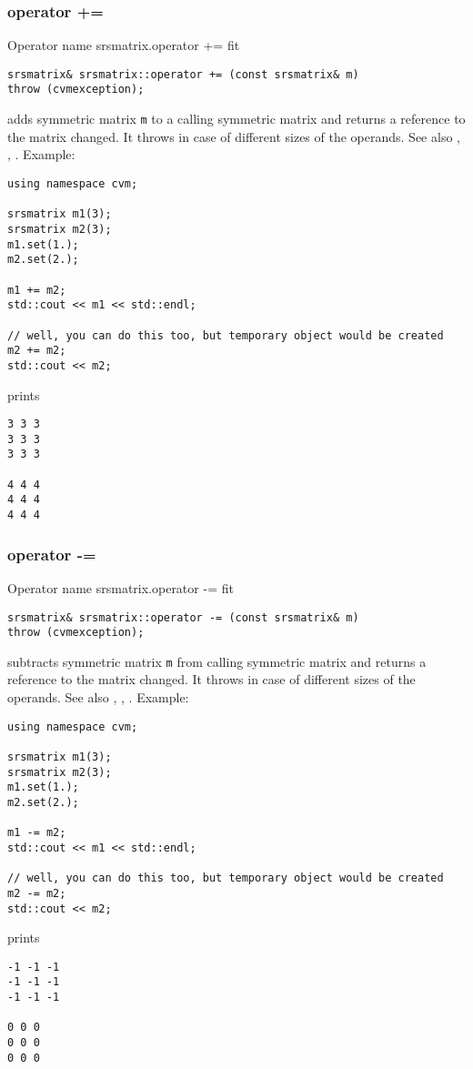 \subsubsection{operator +=}
Operator%
\pdfdest name {srsmatrix.operator +=} fit
\begin{verbatim}
srsmatrix& srsmatrix::operator += (const srsmatrix& m)
throw (cvmexception);
\end{verbatim}
adds symmetric matrix \verb"m" to a calling symmetric matrix 
and returns a reference to
the matrix changed.
It throws  
in case of different sizes of the operands.
See also ,
,
.
Example:
\begin{Verbatim}
using namespace cvm;

srsmatrix m1(3);
srsmatrix m2(3);
m1.set(1.);
m2.set(2.);

m1 += m2;
std::cout << m1 << std::endl;

// well, you can do this too, but temporary object would be created
m2 += m2; 
std::cout << m2;
\end{Verbatim}
prints
\begin{Verbatim}
3 3 3
3 3 3
3 3 3

4 4 4
4 4 4
4 4 4
\end{Verbatim}
\newpage




\subsubsection{operator -=}
Operator%
\pdfdest name {srsmatrix.operator -=} fit
\begin{verbatim}
srsmatrix& srsmatrix::operator -= (const srsmatrix& m)
throw (cvmexception);
\end{verbatim}
subtracts symmetric matrix \verb"m" from  calling symmetric matrix
and returns a reference to
the matrix changed.
It throws  
in case of different sizes of the operands.
See also ,
,
.
Example:
\begin{Verbatim}
using namespace cvm;

srsmatrix m1(3);
srsmatrix m2(3);
m1.set(1.);
m2.set(2.);

m1 -= m2;
std::cout << m1 << std::endl;

// well, you can do this too, but temporary object would be created
m2 -= m2; 
std::cout << m2;
\end{Verbatim}
prints
\begin{Verbatim}
-1 -1 -1
-1 -1 -1
-1 -1 -1

0 0 0
0 0 0
0 0 0
\end{Verbatim}
\newpage



